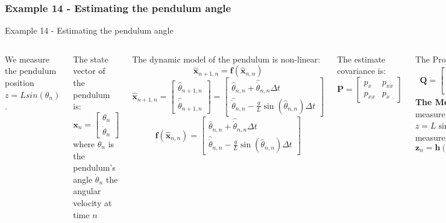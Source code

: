 \subsubsection{Example 14 - Estimating the pendulum angle}
\begin{frame}{Example 14 - Estimating the pendulum angle}
\begin{columns}
We measure the pendulum position $z = Lsin(\theta_n)$.

The state vector of the pendulum is:
\[
\mathbf{x}_n =
\begin{bmatrix}
\theta_n \\
\dot{\theta}_n
\end{bmatrix}
\]
where $\theta_n$ is the pendulum's angle  $\dot{\theta}_n$ the angular velocity at time $n$

The dynamic model of the pendulum is non-linear:
\[
\hat{\mathbf{x}}_{n+1,n} = \mathbf{f}(\hat{\mathbf{x}}_{n,n})
\]
\[
\hat{\mathbf{x}}_{n+1,n} =
\begin{bmatrix}
\hat{\theta}_{n+1,n} \\
\hat{\dot{\theta}}_{n+1,n}
\end{bmatrix}
=
\begin{bmatrix}
\hat{\theta}_{n,n} + \hat{\dot{\theta}}_{n,n} \Delta t \\
\hat{\dot{\theta}}_{n,n} - \frac{g}{L} \sin(\hat{\theta}_{n,n}) \Delta t
\end{bmatrix}
\]
\[
\mathbf{f}(\hat{\mathbf{x}}_{n,n}) =
\begin{bmatrix}
\hat{\theta}_{n,n} + \hat{\dot{\theta}}_{n,n} \Delta t \\
\hat{\dot{\theta}}_{n,n} - \frac{g}{L} \sin(\hat{\theta}_{n,n}) \Delta t
\end{bmatrix}
\]

The estimate covariance is:
\[
\mathbf{P} =
\begin{bmatrix}
p_{x} & p_{x\dot{x}} \\
p_{\dot{x}x} & p_{\dot{x}}
\end{bmatrix}
\]



The Process Noise Matrix:
\[
\mathbf{Q} =
\begin{bmatrix}
\sigma^2_{x} & \sigma^2_{x\dot{x}} \\
\sigma^2_{\dot{x}x} & \sigma^2_{\dot{x}}
\end{bmatrix}
=
\begin{bmatrix}
\frac{\Delta t^4}{4} & \frac{\Delta t^3}{2} \\
\frac{\Delta t^3}{2} & \Delta t^2
\end{bmatrix}
\sigma^2_{a}
\]
\textbf{The Measurement Equation}
We measure the pendulum position: $ z= L \sin(\theta_n)$, i.e., the state-to-measurement relation is non-linear:
\[
\mathbf{z}_n = \mathbf{h}(\mathbf{x}_n), \quad
\mathbf{h}(\mathbf{x}_n) = L \sin(\theta_n)
\]


\end{columns}
\end{frame}
